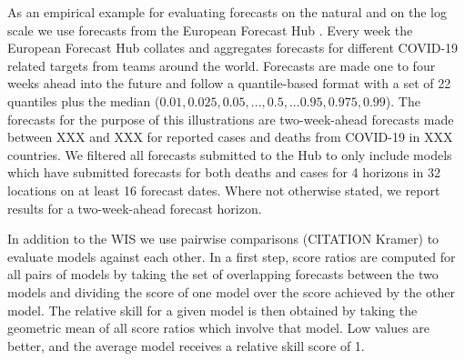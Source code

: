 \documentclass{article}
\begin{document}
As an empirical example for evaluating forecasts on the natural and on the log scale we use forecasts from the European Forecast Hub \citep{europeancovid-19forecasthubEuropeanCovid19Forecast2021, sherrattPredictivePerformanceMultimodel2022}. Every week the European Forecast Hub collates and aggregates forecasts for different COVID-19 related targets from teams around the world. Forecasts are made one to four weeks ahead into the future and follow a quantile-based format with a set of 22 quantiles plus the median ($0.01, 0.025, 0.05, ..., 0.5, ... 0.95, 0.975, 0.99$). The forecasts for the purpose of this illustrations are two-week-ahead forecasts made between XXX and XXX for reported cases and deaths from COVID-19 in XXX countries. We filtered all forecasts submitted to the Hub to only include models which have submitted forecasts for both deaths and cases for 4 horizons in 32 locations on at least 16 forecast dates. Where not otherwise stated, we report results for a two-week-ahead forecast horizon. 

In addition to the WIS we use pairwise comparisons (CITATION Kramer) to evaluate models against each other. In a first step, score ratios are computed for all pairs of models by taking the set of overlapping forecasts between the two models and dividing the score of one model over the score achieved by the other model. The relative skill for a given model is then obtained by taking the geometric mean of all score ratios which involve that model. Low values are better, and the average model receives a relative skill score of 1. 

% 
\end{document}
